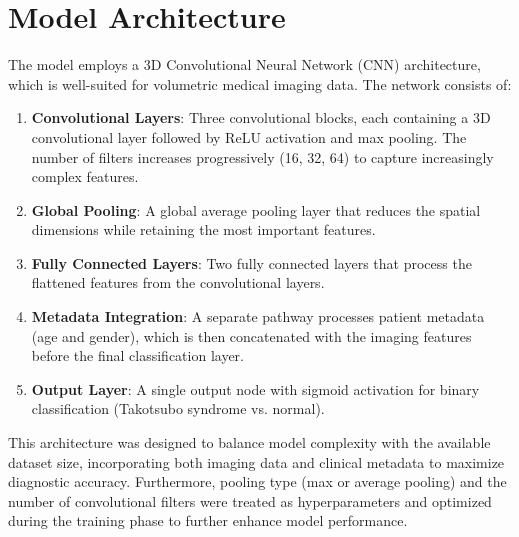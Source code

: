 \documentclass[12pt, BSc]{muthesis}
\begin{document}

\section{Model Architecture} 

The model employs a 3D Convolutional Neural Network (CNN) architecture, which is well-suited for volumetric medical imaging data. The network consists of:

\begin{enumerate}
    \item \textbf{Convolutional Layers}: Three convolutional blocks, each containing a 3D convolutional layer followed by ReLU activation and max pooling. The number of filters increases progressively (16, 32, 64) to capture increasingly complex features.

    \item \textbf{Global Pooling}: A global average pooling layer that reduces the spatial dimensions while retaining the most important features.

    \item \textbf{Fully Connected Layers}: Two fully connected layers that process the flattened features from the convolutional layers.

    \item \textbf{Metadata Integration}: A separate pathway processes patient metadata (age and gender), which is then concatenated with the imaging features before the final classification layer.

    \item \textbf{Output Layer}: A single output node with sigmoid activation for binary classification (Takotsubo syndrome vs. normal).
\end{enumerate}

This architecture was designed to balance model complexity with the available dataset size, incorporating both imaging data and clinical metadata to maximize diagnostic accuracy.
Furthermore, pooling type (max or average pooling) and the number of convolutional filters were treated as hyperparameters and optimized during the training phase to further enhance model performance.
\end{document}
